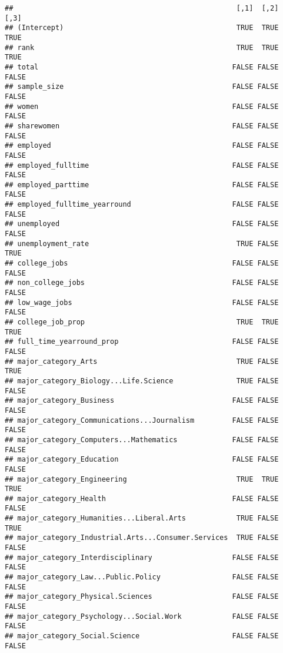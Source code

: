 \documentclass[
]{article}
\begin{document}
\begin{verbatim}
##                                                     [,1]  [,2]  [,3]
## (Intercept)                                         TRUE  TRUE  TRUE
## rank                                                TRUE  TRUE  TRUE
## total                                              FALSE FALSE FALSE
## sample_size                                        FALSE FALSE FALSE
## women                                              FALSE FALSE FALSE
## sharewomen                                         FALSE FALSE FALSE
## employed                                           FALSE FALSE FALSE
## employed_fulltime                                  FALSE FALSE FALSE
## employed_parttime                                  FALSE FALSE FALSE
## employed_fulltime_yearround                        FALSE FALSE FALSE
## unemployed                                         FALSE FALSE FALSE
## unemployment_rate                                   TRUE FALSE  TRUE
## college_jobs                                       FALSE FALSE FALSE
## non_college_jobs                                   FALSE FALSE FALSE
## low_wage_jobs                                      FALSE FALSE FALSE
## college_job_prop                                    TRUE  TRUE  TRUE
## full_time_yearround_prop                           FALSE FALSE FALSE
## major_category_Arts                                 TRUE FALSE  TRUE
## major_category_Biology...Life.Science               TRUE FALSE FALSE
## major_category_Business                            FALSE FALSE FALSE
## major_category_Communications...Journalism         FALSE FALSE FALSE
## major_category_Computers...Mathematics             FALSE FALSE FALSE
## major_category_Education                           FALSE FALSE FALSE
## major_category_Engineering                          TRUE  TRUE  TRUE
## major_category_Health                              FALSE FALSE FALSE
## major_category_Humanities...Liberal.Arts            TRUE FALSE  TRUE
## major_category_Industrial.Arts...Consumer.Services  TRUE FALSE FALSE
## major_category_Interdisciplinary                   FALSE FALSE FALSE
## major_category_Law...Public.Policy                 FALSE FALSE FALSE
## major_category_Physical.Sciences                   FALSE FALSE FALSE
## major_category_Psychology...Social.Work            FALSE FALSE FALSE
## major_category_Social.Science                      FALSE FALSE FALSE
\end{verbatim}
\end{document}

